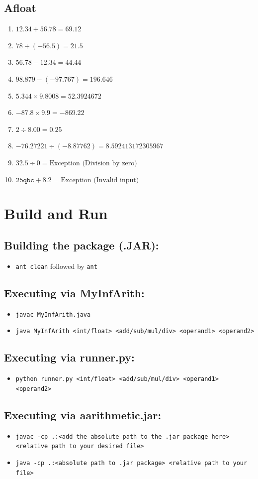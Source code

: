 \documentclass[12pt]{article}
\begin{document}
\subsection{Afloat}
\begin{enumerate}
    \item \(12.34 + 56.78 = 69.12\)
    \item \(78 + (-56.5) = 21.5\)
    \item \(56.78 - 12.34 = 44.44\)
    \item \(98.879 - (-97.767) = 196.646\)
    \item \(5.344 \times 9.8008 = 52.3924672\)
    \item \(-87.8 \times 9.9 = -869.22\)
    \item \(2 \div 8.00 = 0.25\)
    \item \(-76.27221 \div (-8.87762) = 8.592413172305967\)
    \item \(32.5 \div 0 = \text{Exception (Division by zero)}\)
    \item \(\texttt{25qbc} + 8.2 = \text{Exception (Invalid input)}\)

\end{enumerate}

\section{Build and Run}

\subsection{Building the package (.JAR):}
\begin{itemize}
    \item \texttt{ant clean} followed by \texttt{ant}
\end{itemize}

\subsection{Executing via MyInfArith:}
\begin{itemize}
    \item \texttt{javac MyInfArith.java}
    \item \texttt{java MyInfArith <int/float> <add/sub/mul/div> <operand1> <operand2>}
\end{itemize}

\subsection{Executing via runner.py:} 
\begin{itemize}
    \item \texttt{python runner.py <int/float> <add/sub/mul/div> <operand1> <operand2>}
\end{itemize}

\subsection{Executing via aarithmetic.jar:} 
\begin{itemize}
    \item \texttt{javac -cp .:<add the absolute path to the .jar package here> <relative path to your desired file>}
    \item \texttt{java -cp .:<absolute path to .jar package> <relative path to your file>}
\end{itemize}
\end{document}
